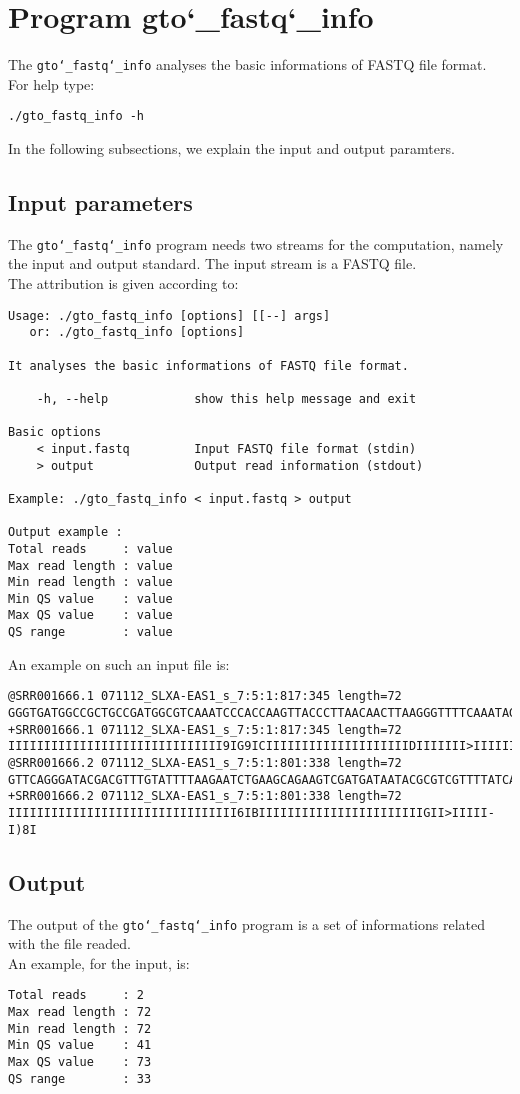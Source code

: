 \section{Program gto\char`_fastq\char`_info}
The \texttt{gto\char`_fastq\char`_info} analyses the basic informations of FASTQ file format.\\
For help type:
\begin{lstlisting}
./gto_fastq_info -h
\end{lstlisting}
In the following subsections, we explain the input and output paramters.

\subsection*{Input parameters}

The \texttt{gto\char`_fastq\char`_info} program needs two streams for the computation,
namely the input and output standard. The input stream is a FASTQ file.\\
The attribution is given according to:
\begin{lstlisting}
Usage: ./gto_fastq_info [options] [[--] args]
   or: ./gto_fastq_info [options]

It analyses the basic informations of FASTQ file format.

    -h, --help            show this help message and exit

Basic options
    < input.fastq         Input FASTQ file format (stdin)
    > output              Output read information (stdout)

Example: ./gto_fastq_info < input.fastq > output

Output example :
Total reads     : value
Max read length : value
Min read length : value
Min QS value    : value
Max QS value    : value
QS range        : value
\end{lstlisting}
An example on such an input file is:
\begin{lstlisting}
@SRR001666.1 071112_SLXA-EAS1_s_7:5:1:817:345 length=72
GGGTGATGGCCGCTGCCGATGGCGTCAAATCCCACCAAGTTACCCTTAACAACTTAAGGGTTTTCAAATAGA
+SRR001666.1 071112_SLXA-EAS1_s_7:5:1:817:345 length=72
IIIIIIIIIIIIIIIIIIIIIIIIIIIIII9IG9ICIIIIIIIIIIIIIIIIIIIIDIIIIIII>IIIIII/
@SRR001666.2 071112_SLXA-EAS1_s_7:5:1:801:338 length=72
GTTCAGGGATACGACGTTTGTATTTTAAGAATCTGAAGCAGAAGTCGATGATAATACGCGTCGTTTTATCAT
+SRR001666.2 071112_SLXA-EAS1_s_7:5:1:801:338 length=72
IIIIIIIIIIIIIIIIIIIIIIIIIIIIIIII6IBIIIIIIIIIIIIIIIIIIIIIIIGII>IIIII-I)8I
\end{lstlisting}

\subsection*{Output}
The output of the \texttt{gto\char`_fastq\char`_info} program is a set of informations related with the file readed. \\
An example, for the input, is:
\begin{lstlisting}
Total reads     : 2
Max read length : 72
Min read length : 72
Min QS value    : 41
Max QS value    : 73
QS range        : 33
\end{lstlisting}
